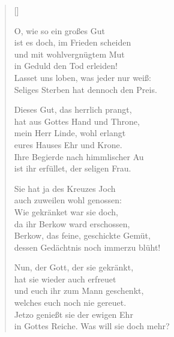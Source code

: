 \begin{multicols}{2}
\settowidth{\versewidth}{Nun, der Gott, der sie gekränkt,}
\begin{verse}[\versewidth]

 O, wie so ein großes Gut\\
ist es doch, im Frieden scheiden\\
und mit wohlvergnügtem Mut\\
in Geduld den Tod erleiden!\\
Lasset uns loben, was jeder nur weiß:\\
Seliges Sterben hat dennoch den Preis.

 Dieses Gut, das herrlich prangt,\\
hat aus Gottes Hand und Throne,\\
mein Herr Linde, wohl erlangt\\
eures Hauses Ehr und Krone.\\
Ihre Begierde nach himmlischer Au\\
ist ihr erfüllet, der seligen Frau.

 Sie hat ja des Kreuzes Joch\\
auch zuweilen wohl genossen:\\
Wie gekränket war sie doch,\\
da ihr Berkow ward erschossen,\\
Berkow, das feine, geschickte Gemüt,\\
dessen Gedächtnis noch immerzu blüht!

 Nun, der Gott, der sie gekränkt,\\
hat sie wieder auch erfreuet\\
und euch ihr zum Mann geschenkt,\\
welches euch noch nie gereuet.\\
Jetzo genießt sie der ewigen Ehr\\
in Gottes Reiche. Was will sie doch mehr?

\end{verse}
\end{multicols}
